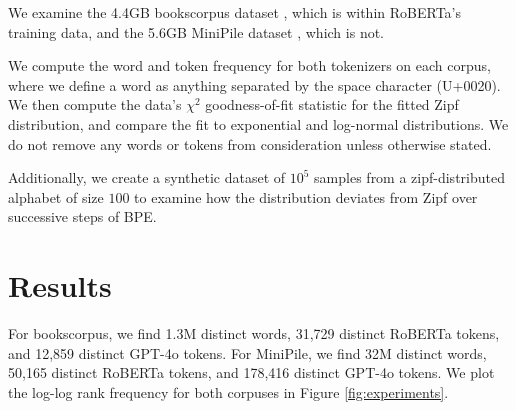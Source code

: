 \documentclass[11pt]{article}
\begin{document}
We examine the 4.4GB bookscorpus dataset \cite{zhu2015aligningbooksmoviesstorylike}, which is within RoBERTa's training data, and the 5.6GB MiniPile dataset \cite{kaddour2023minipilechallengedataefficientlanguage}, which is not.

We compute the word and token frequency for both tokenizers on each corpus, where we define a word as anything separated by the space character (U+0020). We then compute the data's $\chi^2$ goodness-of-fit statistic for the fitted Zipf distribution, and compare the fit to exponential and log-normal distributions. We do not remove any words or tokens from consideration unless otherwise stated.

Additionally, we create a synthetic dataset of $10^5$ samples from a zipf-distributed alphabet of size $100$ to examine how the distribution deviates from Zipf over successive steps of BPE. 

\section{Results}

For bookscorpus, we find 1.3M distinct words, 31,729 distinct RoBERTa tokens, and 12,859 distinct GPT-4o tokens. For MiniPile, we find 32M distinct words, 50,165 distinct RoBERTa tokens, and 178,416 distinct GPT-4o tokens. We plot the log-log rank frequency for both corpuses in Figure \ref{fig:experiments}. 
\end{document}
